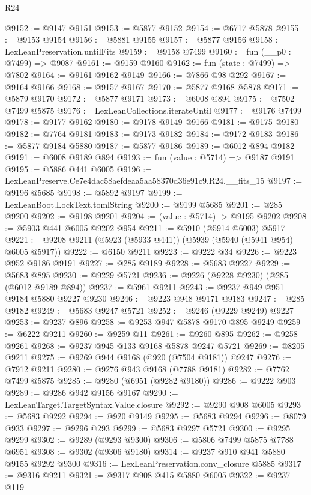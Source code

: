\begin{lexlean}{R24}
\begin{coremodule}
@9152 := @9147 @9151
@9153 := @5877 @9152
@9154 := @6717 @5878
@9155 := @9153 @9154
@9156 := @5881 @9155
@9157 := @5877 @9156
@9158 := LexLeanPreservation.untilFits
@9159 := @9158 @7499
@9160 := fun (__p0 : @7499) => @9087
@9161 := @9159 @9160
@9162 := fun (state : @7499) => @7802
@9164 := @9161 @9162 @9149
@9166 := @7866 @98 @292
@9167 := @9164 @9166
@9168 := @9157 @9167
@9170 := @5877 @9168 @5878
@9171 := @5879 @9170
@9172 := @5877 @9171
@9173 := @6008 @894
@9175 := @7502 @7499 @5875
@9176 := LexLeanCollections.iterateUntil
@9177 := @9176 @7499
@9178 := @9177 @9162
@9180 := @9178 @9149 @9166
@9181 := @9175 @9180
@9182 := @7764 @9181
@9183 := @9173 @9182
@9184 := @9172 @9183
@9186 := @5877 @9184 @5880
@9187 := @5877 @9186
@9189 := @6012 @894 @9182
@9191 := @6008 @9189 @894
@9193 := fun (value : @5714) => @9187 @9191
@9195 := @5886 @441 @6005
@9196 := LexLeanPreserve.Ce7e4dac58aefdeaa5aa58370d36e91c9.R24.__fits_15
@9197 := @9196 @5685
@9198 := @5892 @9197
@9199 := LexLeanBoot.LockText.tomlString
@9200 := @9199 @5685
@9201 := @285 @9200
@9202 := @9198 @9201
@9204 := (value : @5714) -> @9195 @9202
@9208 := @5903 @441 @6005 @9202 @954
@9211 := @5910 (@5914 @6003) @5917
@9221 := @9208 @9211 (@5923 (@5933 @441)) (@5939 (@5940 (@5941 @954) @6005 @5917))
@9222 := @6150 @9211
@9223 := @9222 @34
@9226 := @9223 @952 @9186 @9191
@9227 := @285 @9189
@9228 := @5683 @9227
@9229 := @5683 @895
@9230 := @9229 @5721
@9236 := @9226 (@9228 @9230) (@285 (@6012 @9189 @894))
@9237 := @5961 @9211
@9243 := @9237 @949 @951 @9184 @5880 @9227 @9230
@9246 := @9223 @948 @9171 @9183
@9247 := @285 @9182
@9249 := @5683 @9247 @5721
@9252 := @9246 (@9229 @9249) @9227
@9253 := @9237 @896
@9258 := @9253 @947 @5878 @9170 @895 @9249
@9259 := @6222 @9211
@9260 := @9259 @11
@9261 := @9260 @895
@9262 := @9258 @9261
@9268 := @9237 @945 @133 @9168 @5878 @9247 @5721
@9269 := @8205 @9211
@9275 := @9269 @944 @9168 (@920 (@7504 @9181)) @9247
@9276 := @7912 @9211
@9280 := @9276 @943 @9168 (@7788 @9181)
@9282 := @7762 @7499 @5875
@9285 := @9280 (@6951 (@9282 @9180))
@9286 := @9222 @903
@9289 := @9286 @942 @9156 @9167
@9290 := LexLeanTarget.TargetSyntax.Value.closure
@9292 := @9290 @908 @6005
@9293 := @5683 @9292
@9294 := @920 @9149
@9295 := @5683 @9294
@9296 := @8079 @933
@9297 := @9296 @293
@9299 := @5683 @9297 @5721
@9300 := @9295 @9299
@9302 := @9289 (@9293 @9300)
@9306 := @5806 @7499 @5875 @7788 @6951
@9308 := @9302 (@9306 @9180)
@9314 := @9237 @910 @941 @5880 @9155 @9292 @9300
@9316 := LexLeanPreservation.conv_closure @5885
@9317 := @9316 @9211
@9321 := @9317 @908 @415 @5880 @6005
@9322 := @9237 @119

\end{coremodule}
\end{lexlean}
